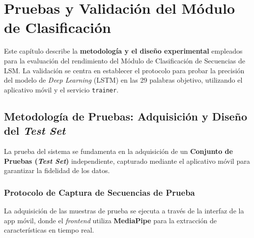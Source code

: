 \chapter{Pruebas y Validación del Módulo de Clasificación}
\label{chap:pruebas}

Este capítulo describe la \textbf{metodología y el diseño experimental} empleados para la evaluación del rendimiento del Módulo de Clasificación de Secuencias de LSM. La validación se centra en establecer el protocolo para probar la precisión del modelo de \textit{Deep Learning} (LSTM) en las 29 palabras objetivo, utilizando el aplicativo móvil y el servicio \texttt{trainer}.

\section{Metodología de Pruebas: Adquisición y Diseño del \textit{Test Set}}

La prueba del sistema se fundamenta en la adquisición de un \textbf{Conjunto de Pruebas (\textit{Test Set})} independiente, capturado mediante el aplicativo móvil para garantizar la fidelidad de los datos.

\subsection{Protocolo de Captura de Secuencias de Prueba}

La adquisición de las muestras de prueba se ejecuta a través de la interfaz de la app móvil, donde el \textit{frontend} utiliza \textbf{MediaPipe} para la extracción de características en tiempo real.

